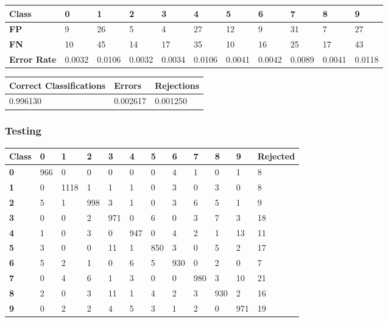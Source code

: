 \documentclass[
  a4paper,            %
  DIV=10,             %
  oneside,            %
  BCOR=5mm,           %
  parskip=half,       %
  numbers=noenddot,   %
  bibtotoc,           %
  listof=totoc,        %
  article
]{scrreprt}
\begin{document}
\begin{center}
  \begin{tabular}{|p{1cm}|p{1cm}|p{1cm}|p{1cm}|p{1cm}|p{1cm}|p{1cm}|p{1cm}|p{1cm}|p{1cm}|p{1cm}|}
    \hline
    \textbf{Class} & \textbf{0} & \textbf{1} & \textbf{2} & \textbf{3} & \textbf{4} & \textbf{5} & \textbf{6} & \textbf{7} & \textbf{8} & \textbf{9} \\
    \hline
    \textbf{FP} & 9 & 26 & 5 & 4 & 27 & 12 & 9 & 31 & 7 & 27 \\
    \hline
    \textbf{FN} & 10 & 45 & 14 & 17 & 35 & 10 & 16 & 25 & 17 & 43 \\
    \hline
    \textbf{Error Rate} & 0.0032 & 0.0106 & 0.0032 & 0.0034 & 0.0106 & 0.0041 & 0.0042 & 0.0089 & 0.0041 & 0.0118 \\
    \hline
  \end{tabular}
\end{center}

\begin{center}
  \begin{tabular}{|p{5cm}|p{3cm}|p{3cm}|}
    \hline
    \textbf{Correct Classifications} & \textbf{Errors} & \textbf{Rejections} \\
    \hline
    0.996130 & 0.002617 & 0.001250 \\
    \hline
  \end{tabular}
\end{center}
\subsubsection{Testing}
\begin{center}
  \begin{tabular}{|p{1cm}|p{1cm}|p{1cm}|p{1cm}|p{1cm}|p{1cm}|p{1cm}|p{1cm}|p{1cm}|p{1cm}|p{1cm}|p{1.7cm}|}
    \hline
    \textbf{Class} & \textbf{0} & \textbf{1} & \textbf{2} & \textbf{3} & \textbf{4} & \textbf{5} & \textbf{6} & \textbf{7} & \textbf{8} & \textbf{9} & \textbf{Rejected} \\
    \hline
    \textbf{0} & 966 & 0 & 0 & 0 & 0 & 0 & 4 & 1 & 0 & 1 & 8 \\
    \hline
    \textbf{1} & 0 & 1118 & 1 & 1 & 1 & 0 & 3 & 0 & 3 & 0 & 8 \\
    \hline
    \textbf{2} & 5 & 1 & 998 & 3 & 1 & 0 & 3 & 6 & 5 & 1 & 9 \\
    \hline
    \textbf{3} & 0 & 0 & 2 & 971 & 0 & 6 & 0 & 3 & 7 & 3 & 18 \\
    \hline
    \textbf{4} & 1 & 0 & 3 & 0 & 947 & 0 & 4 & 2 & 1 & 13 & 11 \\
    \hline
    \textbf{5} & 3 & 0 & 0 & 11 & 1 & 850 & 3 & 0 & 5 & 2 & 17 \\
    \hline
    \textbf{6} & 5 & 2 & 1 & 0 & 6 & 5 & 930 & 0 & 2 & 0 & 7 \\
    \hline
    \textbf{7} & 0 & 4 & 6 & 1 & 3 & 0 & 0 & 980 & 3 & 10 & 21 \\
    \hline
    \textbf{8} & 2 & 0 & 3 & 11 & 1 & 4 & 2 & 3 & 930 & 2 & 16 \\
    \hline
    \textbf{9} & 0 & 2 & 2 & 4 & 5 & 3 & 1 & 2 & 0 & 971 & 19 \\
    \hline
  \end{tabular}
\end{center}
\end{document}
